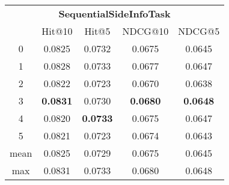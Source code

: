 \documentclass{article}
\begin{document}
 

\begin{tabular}{c|cccc}

\multicolumn{5}{c}{\textbf{SequentialSideInfoTask}} \\
\noalign{\smallskip}
\noalign{\smallskip}
\toprule
\multicolumn{1}{c}{Template ID}	&	\multicolumn{1}{|c}{Hit@10}	&	\multicolumn{1}{c}{Hit@5}	&	\multicolumn{1}{c}{NDCG@10}	&	\multicolumn{1}{c}{NDCG@5}\\
\midrule
0	&	0.0825	&	0.0732	&	0.0675	&	0.0645\\
1	&	0.0828	&	0.0733	&	0.0677	&	0.0647\\
2	&	0.0822	&	0.0723	&	0.0670	&	0.0638\\
3	&	\textbf{0.0831}	&	0.0730	&	\textbf{0.0680}	&	\textbf{0.0648}\\
4	&	0.0820	&	\textbf{0.0733}	&	0.0675	&	0.0647\\
5	&	0.0821	&	0.0723	&	0.0674	&	0.0643\\
\midrule
mean	&	0.0825	&	0.0729	&	0.0675	&	0.0645\\
max	&	0.0831	&	0.0733	&	0.0680	&	0.0648\\
\bottomrule

\end{tabular}
\end{document}

